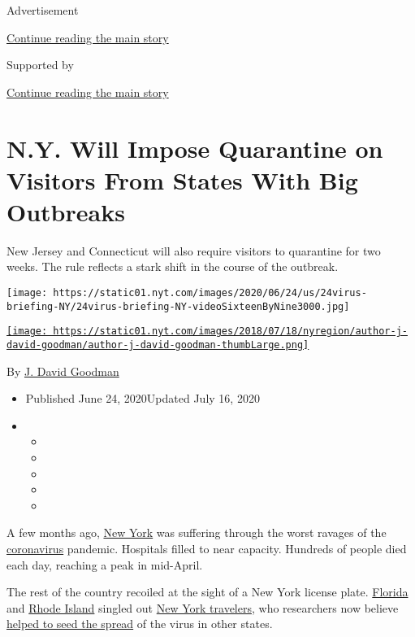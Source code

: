 Advertisement

\protect\hyperlink{after-top}{Continue reading the main story}

Supported by

\protect\hyperlink{after-sponsor}{Continue reading the main story}

\hypertarget{ny-will-impose-quarantine-on-visitors-from-states-with-big-outbreaks}{%
\section{N.Y. Will Impose Quarantine on Visitors From States With Big
Outbreaks}\label{ny-will-impose-quarantine-on-visitors-from-states-with-big-outbreaks}}

New Jersey and Connecticut will also require visitors to quarantine for
two weeks. The rule reflects a stark shift in the course of the
outbreak.

\texttt{[image: https://static01.nyt.com/images/2020/06/24/us/24virus-briefing-NY/24virus-briefing-NY-videoSixteenByNine3000.jpg]}

\href{https://www.nytimes.com/by/j-david-goodman}{\texttt{[image: https://static01.nyt.com/images/2018/07/18/nyregion/author-j-david-goodman/author-j-david-goodman-thumbLarge.png]}}

By \href{https://www.nytimes.com/by/j-david-goodman}{J. David Goodman}

\begin{itemize}
\item
  Published June 24, 2020Updated July 16, 2020
\item
  \begin{itemize}
  \item
  \item
  \item
  \item
  \item
  \end{itemize}
\end{itemize}

A few months ago,
\href{https://www.nytimes.com/2020/07/14/nyregion/coronavirus-ny-travel-cuomo.html}{New
York} was suffering through the worst ravages of the
\href{https://www.nytimes.com/2020/07/16/travel/virus-vacation.html}{coronavirus}
pandemic. Hospitals filled to near capacity. Hundreds of people died
each day, reaching a peak in mid-April.

The rest of the country recoiled at the sight of a New York license
plate.
\href{https://www.flgov.com/wp-content/uploads/orders/2020/EO_20-82.pdf}{Florida}
and
\href{https://www.democratandchronicle.com/story/news/politics/albany/2020/03/29/coronavirus-rhode-repeals-new-york-quarantine-order/2935388001/}{Rhode
Island} singled out
\href{https://www.nytimes.com/2020/07/14/nyregion/ny-quarantine-rules.html}{New
York travelers}, who researchers now believe
\href{https://www.nytimes.com/2020/05/07/us/new-york-city-coronavirus-outbreak.html}{helped
to seed the spread} of the virus in other states.

